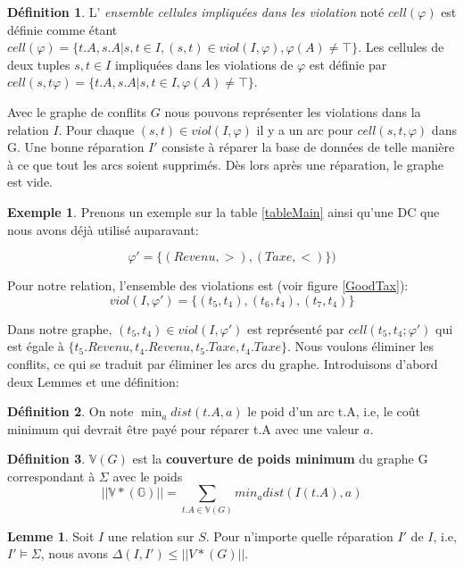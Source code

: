 \documentclass[letterpaper, 12pt]{report}
\theoremstyle{definition}
\newtheorem{mydef}{Définition}
\newtheorem{mylemma}{Lemme}
\newtheorem{myexample}{Exemple}
\begin{document}
\begin{mydef}
	L' \emph{ensemble cellules impliquées dans les violation} noté $cell(\varphi)$ est définie comme étant $cell(\varphi) = \{t.A,s.A|s,t \in I, (s,t) \in viol(I,\varphi), \varphi(A) \neq \top \}$. Les cellules de deux tuples $s,t \in I$ impliquées dans les violations de $\varphi$ est définie par $cell(s,t\varphi) = \{t.A,s.A|s,t \in I, \varphi(A) \neq \top \}$.
\end{mydef}

Avec le graphe de conflits $G$ nous pouvons représenter les violations dans la relation $I$. Pour chaque $(s,t) \in viol(I,\varphi)$ il y a un arc pour $cell(s,t,\varphi)$ dans G. Une bonne réparation $I'$ consiste à réparer la base de données de telle manière à ce que tout les arcs soient supprimés. Dès lors après une réparation, le graphe est vide.

\begin{myexample}
Prenons un exemple sur la table \ref{tableMain} ainsi qu'une DC que nous avons déjà utilisé auparavant:

$$\varphi' =\{(Revenu,>),(Taxe,<) \})$$

Pour notre relation, l'ensemble des violations est (voir figure \ref{GoodTax}):
 $$ viol(I,\varphi') = \{ (t_5,t_4),(t_6,t_4),(t_7,t_4) \}$$

Dans notre graphe, $(t_5,t_4) \in viol(I,\varphi')$ est représenté par $cell(t_5,t_4;\varphi')$ qui est égale à $\{ t_5.Revenu, t_4.Revenu, t_5.Taxe, t_4.Taxe\}$. Nous voulons éliminer les conflits, ce qui se traduit par éliminer les arcs du graphe. Introduisons d'abord deux Lemmes et une définition: \cite{main}
\end{myexample}
\begin{mydef}
	On note $ \min_{a} dist(t.A,a) $ le poid d'un arc t.A, i.e, le coût minimum qui devrait être payé pour réparer t.A avec une valeur $a$.
\end{mydef}

\begin{mydef}
	$\mathbb{V}(G)$ est la \textbf{couverture de poids minimum} du graphe G correspondant à $\Sigma$ avec le poids
	$$||\mathbb{V*(G)}|| = \sum_{t.A \in \mathbb{V}(G)} min_{a} dist(I(t.A),a)$$
\end{mydef}

\begin{mylemma}
	Soit $I$ une relation sur $S$. Pour n'importe quelle réparation $I'$ de $I$, i.e, $I' \models \Sigma$, nous avons $\Delta(I,I') \leq ||V*(G)||$. 
\end{mylemma}
\end{document}
